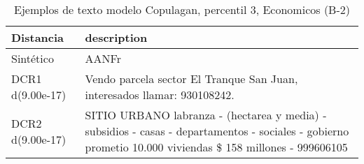 \begin{table}[H]
\centering
\fontsize{10}{14}\selectfont
\caption{Ejemplos de texto modelo Copulagan, percentil 3, Economicos (B-2)}
\label{table-example-economicos-b-2-copulagan-3p-text}
\begin{tabular}{|l|m{35em}|}
\hline
\rowcolor[gray]{0.8}
Distancia & description \\
\hline Sintético & AANFr \\
\hline DCR1 d(9.00e-17) & Vendo parcela sector El Tranque San Juan, interesados llamar: 930108242. \\
\hline DCR2 d(9.00e-17) & SITIO URBANO labranza - (hectarea y media) - subsidios - casas - departamentos - sociales - gobierno prometio 10.000 viviendas \$ 158 millones - 999606105 \\
\hline
\end{tabular}
\end{table}
